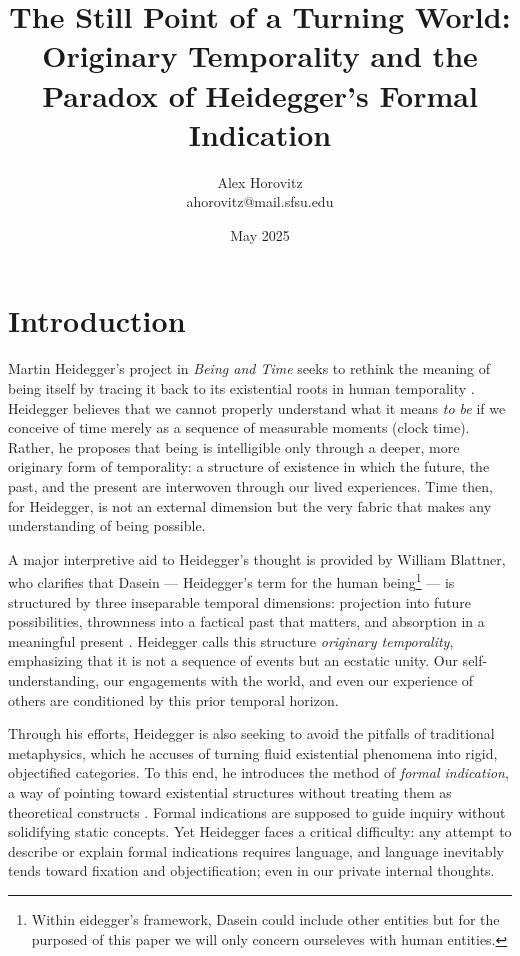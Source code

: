 \documentclass{article}
\title{The Still Point of a Turning World: Originary Temporality and the Paradox of Heidegger's Formal Indication}
\author{Alex Horovitz \\ \small ahorovitz@mail.sfsu.edu}
\date{May 2025}
\begin{document}
\setlength{\parskip}{0.75em}

\maketitle

\section*{Introduction}

Martin Heidegger's project in \textit{Being and Time} seeks to rethink the meaning of being itself by tracing it back to its existential roots in human temporality \parencite[p.~34]{heidegger1962}. Heidegger believes that we cannot properly understand what it means \textit{to be} if we conceive of time merely as a sequence of measurable moments (clock time). Rather, he proposes that being is intelligible only through a deeper, more originary form of temporality: a structure of existence in which the future, the past, and the present are interwoven through our lived experiences. Time then, for Heidegger, is not an external dimension but the very fabric that makes any understanding of being possible.

A major interpretive aid to Heidegger's thought is provided by William Blattner, who clarifies that Dasein --- Heidegger's term for the human being\footnote{Within eidegger's framework, Dasein could include other entities but for the purposed of this paper we will only concern ourseleves with human entities.} --- is structured by three inseparable temporal dimensions: projection into future possibilities, thrownness into a factical past that matters, and absorption in a meaningful present \parencite[pp.~311--312]{blattner2007}. Heidegger calls this structure \textit{originary temporality}, emphasizing that it is not a sequence of events but an ecstatic unity. Our self-understanding, our engagements with the world, and even our experience of others are conditioned by this prior temporal horizon.

Through his efforts, Heidegger is also seeking to avoid the pitfalls of traditional metaphysics, which he accuses of turning fluid existential phenomena into rigid, objectified categories. To this end, he introduces the method of \textit{formal indication}, a way of pointing toward existential structures without treating them as theoretical constructs \parencite[p.~782]{dahlstrom1994}. Formal indications are supposed to guide inquiry without solidifying static concepts. Yet Heidegger faces a critical difficulty: any attempt to describe or explain formal indications requires language, and language inevitably tends toward fixation and objectification; even in our private internal thoughts.
\end{document}
